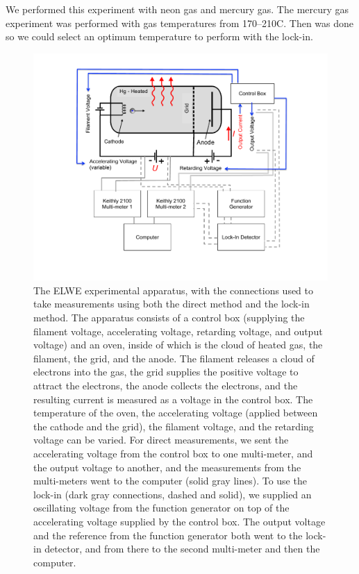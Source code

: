 \documentclass[prb,preprint]{revtex4-1}
\begin{document}
We performed this experiment with neon gas and mercury gas. The mercury gas experiment was performed with gas temperatures from 170\degree--210\degree C. Then was done so we could select an optimum temperature to perform with the lock-in. 
\begin{figure}[h!]
\centering
\includegraphics[width=5in]{set-up.pdf} %
\caption{The ELWE experimental apparatus, with the connections used to take measurements using both the direct method and the lock-in method. The apparatus consists of a control box (supplying the filament voltage, accelerating voltage, retarding voltage, and output voltage) and an oven, inside of which is the cloud of heated gas, the filament, the grid, and the anode. The filament releases a cloud of electrons into the gas, the grid supplies the positive voltage to attract the electrons, the anode collects the electrons, and the resulting current is measured as a voltage in the control box. The temperature of the oven, the accelerating voltage (applied between the cathode and the grid), the filament voltage, and the retarding voltage can be varied. For direct measurements, we sent the accelerating voltage from the control box to one multi-meter, and the output voltage to another, and the measurements from the multi-meters went to the computer (solid gray lines).  To use the lock-in (dark gray connections, dashed and solid), we supplied an oscillating voltage from the function generator on top of the accelerating voltage supplied by the control box. The output voltage and the reference from the function generator both went to the lock-in detector, and from there to the second multi-meter and then the computer. }
\label{set-up}
\end{figure}
\end{document}
